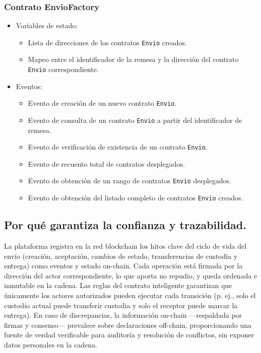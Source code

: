 \subsubsection{Contrato EnvioFactory}
\begin{itemize}
\item Variables de estado:
\begin{itemize}
\item Lista de direcciones de los contratos \texttt{Envio} creados.
\item Mapeo entre el identificador de la remesa y la dirección del contrato \texttt{Envio} correspondiente.
\end{itemize}
\item Eventos:
\begin{itemize}
\item Evento de creación de un nuevo contrato \texttt{Envio}.
\item Evento de consulta de un contrato \texttt{Envio} a partir del identificador de remesa.
\item Evento de verificación de existencia de un contrato \texttt{Envio}.
\item Evento de recuento total de contratos desplegados.
\item Evento de obtención de un rango de contratos \texttt{Envio} desplegados.
\item Evento de obtención del listado completo de contratos \texttt{Envio} creados.
\end{itemize}
\end{itemize}

\subsection{Por qué garantiza la confianza y trazabilidad.}
La plataforma registra en la red blockchain los hitos clave del ciclo de vida del envío (creación, aceptación, cambios de estado, transferencias de custodia y entrega) como eventos y estado on-chain. Cada operación está firmada por la dirección del actor correspondiente, lo que aporta no repudio, y queda ordenada e inmutable en la cadena. Las reglas del contrato inteligente garantizan que únicamente los actores autorizados pueden ejecutar cada transición (p. ej., solo el custodio actual puede transferir custodia y solo el receptor puede marcar la entrega). En caso de discrepancias, la información on-chain —respaldada por firmas y consenso— prevalece sobre declaraciones off-chain, proporcionando una fuente de verdad verificable para auditoría y resolución de conflictos, sin exponer datos personales en la cadena.

